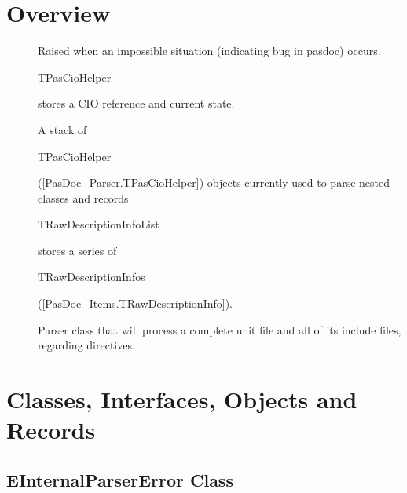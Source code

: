 \documentclass{report}
\newif\ifpdf
\begin{document}
\section{Overview}
\begin{description}
\item[\texttt{\begin{ttfamily}EInternalParserError\end{ttfamily} Class}]Raised when an impossible situation (indicating bug in pasdoc) occurs.
\item[\texttt{\begin{ttfamily}TPasCioHelper\end{ttfamily} Class}]\begin{ttfamily}TPasCioHelper\end{ttfamily} stores a CIO reference and current state.
\item[\texttt{\begin{ttfamily}TPasCioHelperStack\end{ttfamily} Class}]A stack of \begin{ttfamily}TPasCioHelper\end{ttfamily}(\ref{PasDoc_Parser.TPasCioHelper}) objects currently used to parse nested classes and records
\item[\texttt{\begin{ttfamily}TRawDescriptionInfoList\end{ttfamily} Class}]\begin{ttfamily}TRawDescriptionInfoList\end{ttfamily} stores a series of \begin{ttfamily}TRawDescriptionInfos\end{ttfamily}(\ref{PasDoc_Items.TRawDescriptionInfo}).
\item[\texttt{\begin{ttfamily}TParser\end{ttfamily} Class}]Parser class that will process a complete unit file and all of its include files, regarding directives.
\end{description}
\section{Classes, Interfaces, Objects and Records}
\ifpdf
\subsection*{\large{\textbf{EInternalParserError Class}}\normalsize\hspace{1ex}\hrulefill}
\else
\end{document}
